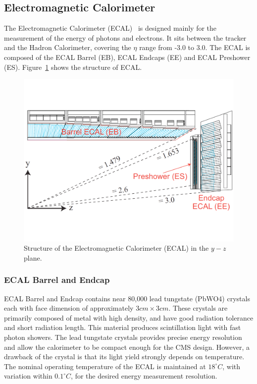\subsection{Electromagnetic Calorimeter} 
The Electromagnetic Calorimeter (ECAL)~\cite{lhc_ecaldesign} is designed mainly for the measurement of the energy of photons and electrons. It sits between the tracker and the Hadron Calorimeter, covering the $\eta$ range from -3.0 to 3.0. The ECAL is composed of the ECAL Barrel (EB), ECAL Endcaps (EE) and ECAL Preshower (ES). Figure~\ref{fig:lhc_ecal} shows the structure of ECAL.
\begin{figure}[htbp]
\begin{center}
\includegraphics[width=0.7\linewidth]{figures/lhc_ecal.pdf}
\caption{Structure of the Electromagnetic Calorimeter (ECAL) in the $y-z$ plane.}
\label{fig:lhc_ecal}
\end{center}
\end{figure}

\subsubsection{ECAL Barrel and Endcap}
ECAL Barrel and Endcap contains near 80,000 lead tungstate (PbWO4) crystals each with face dimension of approximately $3cm\times 3cm$. These crystals are primarily composed of metal with high density, and have good radiation tolerance and short radiation length. This material produces scintillation light with fast photon showers. The lead tungstate crystals provides precise energy resolution and allow the calorimeter to be compact enough for the CMS design. However, a drawback of the crystal is that its light yield strongly depends on temperature. The nominal operating temperature of the ECAL is maintained at $18^{\circ}C$, with variation within $0.1^{\circ}C$, for the desired energy measurement resolution. 

